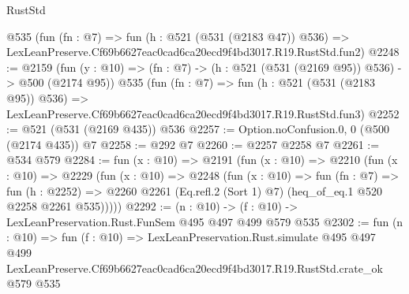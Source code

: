 \begin{lexlean}{RustStd}
\begin{coremodule}
    @535
    (fun (fn : @7) =>
    fun (h : @521 (@531 (@2183 @47)) @536) =>
    LexLeanPreserve.Cf69b6627eac0cad6ca20ecd9f4bd3017.R19.RustStd.fun2)
@2248 := @2159
    (fun (y : @10) => (fn : @7) -> (h : @521 (@531 (@2169 @95)) @536) -> @500 (@2174 @95))
    @535
    (fun (fn : @7) =>
    fun (h : @521 (@531 (@2183 @95)) @536) =>
    LexLeanPreserve.Cf69b6627eac0cad6ca20ecd9f4bd3017.R19.RustStd.fun3)
@2252 := @521 (@531 (@2169 @435)) @536
@2257 := Option.noConfusion.{0, 0} (@500 (@2174 @435)) @7
@2258 := @292 @7
@2260 := @2257 @2258 @7
@2261 := @534 @579
@2284 := fun (x : @10) =>
  @2191
    (fun (x : @10) =>
    @2210
      (fun (x : @10) =>
      @2229
        (fun (x : @10) =>
        @2248
          (fun (x : @10) =>
          fun (fn : @7) =>
          fun (h : @2252) =>
          @2260 @2261 (Eq.refl.{2} (Sort 1) @7) (heq_of_eq.{1} @520 @2258 @2261 @535)))))
@2292 := (n : @10) -> (f : @10) -> LexLeanPreservation.Rust.FunSem @495 @497 @499 @579 @535
@2302 := fun (n : @10) =>
  fun (f : @10) =>
  LexLeanPreservation.Rust.simulate
    @495
    @497
    @499
    LexLeanPreserve.Cf69b6627eac0cad6ca20ecd9f4bd3017.R19.RustStd.crate_ok
    @579
    @535
\end{coremodule}
\end{lexlean}
